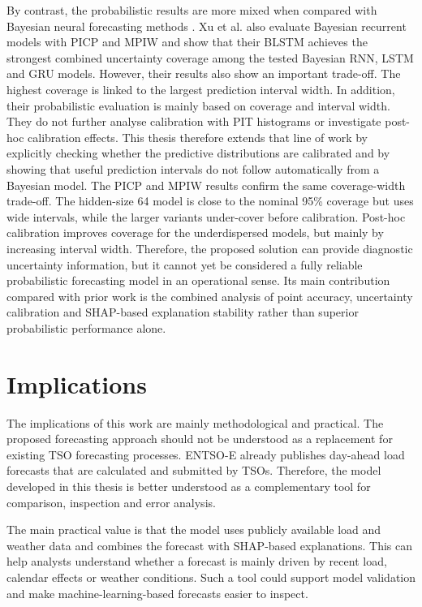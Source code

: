 \documentclass[Master,english,IEEE]{twbook}
\begin{document}
By contrast, the probabilistic results are more mixed when compared with Bayesian neural forecasting methods \cite{blundellWeightUncertaintyNeural2015,xuProbabilisticElectricalLoad2022}. Xu et al. also evaluate Bayesian recurrent models with PICP and MPIW and show that their BLSTM achieves the strongest combined uncertainty coverage among the tested Bayesian RNN, LSTM and GRU models. However, their results also show an important trade-off. The highest coverage is linked to the largest prediction interval width. In addition, their probabilistic evaluation is mainly based on coverage and interval width. They do not further analyse calibration with PIT histograms or investigate post-hoc calibration effects. This thesis therefore extends that line of work by explicitly checking whether the predictive distributions are calibrated and by showing that useful prediction intervals do not follow automatically from a Bayesian model. The PICP and MPIW results confirm the same coverage-width trade-off. The hidden-size 64 model is close to the nominal 95\% coverage but uses wide intervals, while the larger variants under-cover before calibration. Post-hoc calibration improves coverage for the underdispersed models, but mainly by increasing interval width. Therefore, the proposed solution can provide diagnostic uncertainty information, but it cannot yet be considered a fully reliable probabilistic forecasting model in an operational sense. Its main contribution compared with prior work is the combined analysis of point accuracy, uncertainty calibration and SHAP-based explanation stability rather than superior probabilistic performance alone.

\section{Implications}

The implications of this work are mainly methodological and practical. The proposed forecasting approach should not be understood as a replacement for existing TSO forecasting processes. ENTSO-E already publishes day-ahead load forecasts that are calculated and submitted by TSOs. Therefore, the model developed in this thesis is better understood as a complementary tool for comparison, inspection and error analysis.

The main practical value is that the model uses publicly available load and weather data and combines the forecast with SHAP-based explanations. This can help analysts understand whether a forecast is mainly driven by recent load, calendar effects or weather conditions. Such a tool could support model validation and make machine-learning-based forecasts easier to inspect.
\end{document}

